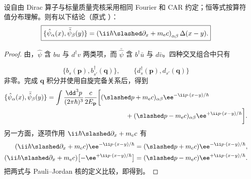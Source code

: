 \begin{proposition}
设自由 Dirac 算子与标量质量壳核采用相同 Fourier 和 CAR 约定；恒等式按算符值分布理解。则有以下结论（原式 ）：
\begin{equation*}
 \boxed{
 \{\hat\psi_\alpha(x),\bar{\hat\psi}_\beta(y)\}
 =\left(\ii\hbar\slashed\partial_x+m_{\mathrm e} c\right)_{\alpha\beta}
 \Delta(x-y).}
\end{equation*}
\end{proposition}
\begin{proof}
由，$\hat\psi$ 含 $bu$ 与 $d^\dagger v$ 两类项，而 $\bar{\hat\psi}$ 含 $b^\dagger\bar u$ 与 $d\bar v$。四种交叉组合中只有

\begin{equation*}
 \{b_s(\mathbf p),b_{s'}^\dagger(\mathbf q)\},
 \qquad
 \{d_s^\dagger(\mathbf p),d_{s'}(\mathbf q)\}
\end{equation*}
非零。完成 $\mathbf q$ 积分并使用自旋完备关系后，得到
\begin{align*}
 \{\hat\psi_\alpha(x),\bar{\hat\psi}_\beta(y)\}
 &=\int\frac{\dd^3 p}{(2\pi\hbar)^3}\frac{c}{2E_{\mathbf p}}
 \bigg[
 (\slashed p+m_{\mathrm e} c)_{\alpha\beta}\ee^{-\ii p\cdot(x-y)/\hbar}\\
 &\hspace{42mm}
 +(\slashed p-m_{\mathrm e} c)_{\alpha\beta}\ee^{+\ii p\cdot(x-y)/\hbar}
 \bigg].
\end{align*}
另一方面，逐项作用 $\ii\hbar\slashed\partial_x+m_{\mathrm e} c$ 有
\begin{align*}
 (\ii\hbar\slashed\partial_x+m_{\mathrm e} c)\ee^{-\ii p\cdot(x-y)/\hbar}
 &=(\slashed p+m_{\mathrm e} c)\ee^{-\ii p\cdot(x-y)/\hbar},\\
 (\ii\hbar\slashed\partial_x+m_{\mathrm e} c)
 \bigl[-\ee^{+\ii p\cdot(x-y)/\hbar}\bigr]
 &=(\slashed p-m_{\mathrm e} c)\ee^{+\ii p\cdot(x-y)/\hbar}.
\end{align*}
把两式与 Pauli--Jordan 核的定义比较，即得到。
\end{proof}


